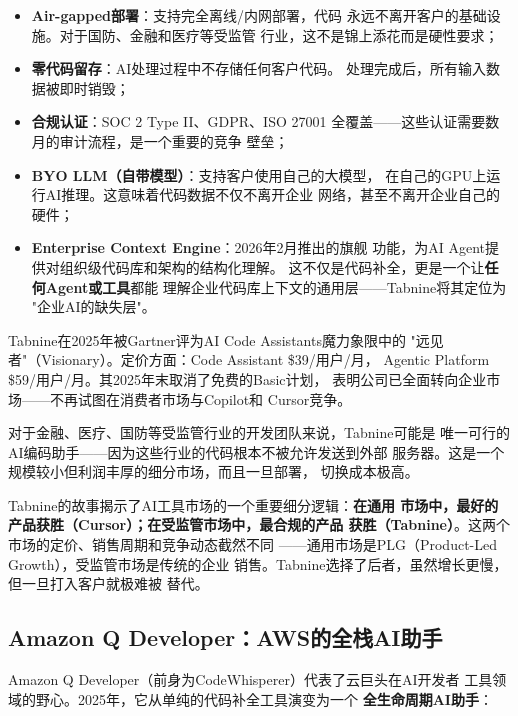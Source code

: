 \begin{itemize}
  \item \textbf{Air-gapped部署}：支持完全离线/内网部署，代码
    永远不离开客户的基础设施。对于国防、金融和医疗等受监管
    行业，这不是锦上添花而是硬性要求；
  \item \textbf{零代码留存}：AI处理过程中不存储任何客户代码。
    处理完成后，所有输入数据被即时销毁；
  \item \textbf{合规认证}：SOC 2 Type II、GDPR、ISO 27001
    全覆盖——这些认证需要数月的审计流程，是一个重要的竞争
    壁垒；
  \item \textbf{BYO LLM（自带模型）}：支持客户使用自己的大模型，
    在自己的GPU上运行AI推理。这意味着代码数据不仅不离开企业
    网络，甚至不离开企业自己的硬件；
  \item \textbf{Enterprise Context Engine}：2026年2月推出的旗舰
    功能，为AI Agent提供对组织级代码库和架构的结构化理解。
    这不仅是代码补全，更是一个让\textbf{任何Agent或工具}都能
    理解企业代码库上下文的通用层——Tabnine将其定位为
    "企业AI的缺失层"。
\end{itemize}

Tabnine在2025年被Gartner评为AI Code Assistants魔力象限中的
"远见者"（Visionary）。定价方面：Code Assistant \$39/用户/月，
Agentic Platform \$59/用户/月。其2025年末取消了免费的Basic计划，
表明公司已全面转向企业市场——不再试图在消费者市场与Copilot和
Cursor竞争。

对于金融、医疗、国防等受监管行业的开发团队来说，Tabnine可能是
唯一可行的AI编码助手——因为这些行业的代码根本不被允许发送到外部
服务器。这是一个规模较小但利润丰厚的细分市场，而且一旦部署，
切换成本极高。

Tabnine的故事揭示了AI工具市场的一个重要细分逻辑：\textbf{在通用
市场中，最好的产品获胜（Cursor）；在受监管市场中，最合规的产品
获胜（Tabnine）}。这两个市场的定价、销售周期和竞争动态截然不同
——通用市场是PLG（Product-Led Growth），受监管市场是传统的企业
销售。Tabnine选择了后者，虽然增长更慢，但一旦打入客户就极难被
替代。

\subsection{Amazon Q Developer：AWS的全栈AI助手}
\label{subsec:amazon-q}

Amazon Q Developer（前身为CodeWhisperer）代表了云巨头在AI开发者
工具领域的野心。2025年，它从单纯的代码补全工具演变为一个
\textbf{全生命周期AI助手}：

